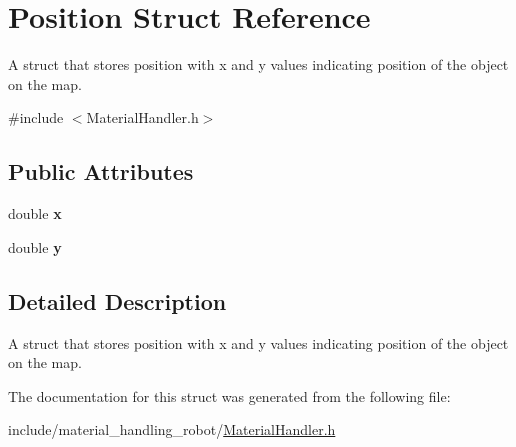 \hypertarget{structPosition}{}\section{Position Struct Reference}
\label{structPosition}


A struct that stores position with x and y values indicating position of the object on the map.  




{\ttfamily \#include $<$Material\+Handler.\+h$>$}

\subsection*{Public Attributes}
\begin{DoxyCompactItemize}
\item 
double {\bfseries x}\hypertarget{structPosition_a9abbe738bad177de91fe4774099c1260}{}\label{structPosition_a9abbe738bad177de91fe4774099c1260}

\item 
double {\bfseries y}\hypertarget{structPosition_a75f48c2a1d2c7131b8be1a0687ae72c8}{}\label{structPosition_a75f48c2a1d2c7131b8be1a0687ae72c8}

\end{DoxyCompactItemize}


\subsection{Detailed Description}
A struct that stores position with x and y values indicating position of the object on the map. 

The documentation for this struct was generated from the following file\+:\begin{DoxyCompactItemize}
\item 
include/material\+\_\+handling\+\_\+robot/\hyperlink{MaterialHandler_8h}{Material\+Handler.\+h}\end{DoxyCompactItemize}
